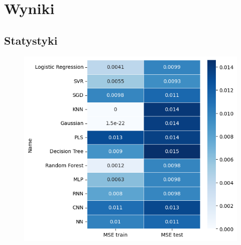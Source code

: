 

\section{Wyniki}

\subsection{Statystyki}

\begin{figure}[H]
    \centering
    \includegraphics[width=\textwidth]{images/mse.png}
    \caption{}
    \label{mse}
\end{figure}

